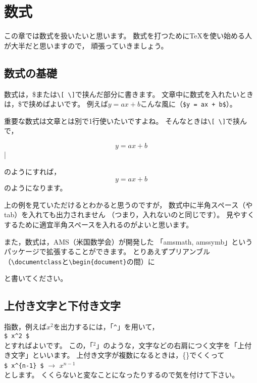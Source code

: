 \documentclass[class=jreport, crop=false, preview=false, dvipdfmx, fleqn]{standalone}
\begin{document}
\chapter{数式}
\label{ch:formulas}

この章では数式を扱いたいと思います。
数式を打つために{\TeX}を使い始める人が大半だと思いますので，
頑張っていきましょう。



\section{数式の基礎}
数式は，{\$}または\verb|\[ \]|で挟んだ部分に書きます。
文章中に数式を入れたいときは，{\$}で挟めばよいです。
例えば$y = ax + b$こんな風に（\verb|$y = ax + b$|）。

重要な数式は文章とは別で1行使いたいですよね。
そんなときは\verb|\[ \]|で挟んで，
\begin{ITeX}
\[ y = ax + b \]|
\end{ITeX}
のようにすれば，
\[ y = ax + b \]
のようになります。

上の例を見ていただけるとわかると思うのですが，
数式中に半角スペース（やtab）を入れても出力されません
（つまり，入れないのと同じです）。
見やすくするために適宜半角スペースを入れるのがよいと思います。

また，数式は，AMS（米国数学会）が開発した
「amsmath, amssymb」というパッケージで拡張することができます。
とりあえずプリアンブル（\verb|\documentclass|と\verb|\begin{document}|の間）に
\begin{ITeX}
\usepackage{amsmath, amssymb}
\end{ITeX}
と書いてください。



\section{上付き文字と下付き文字}
指数，例えば$x^2$を出力するには，「\verb|^|」を用いて，\\
\hspace{5zw} \verb|$ x^2 $| \\
とすればよいです。
この，「${}^{2}$」のような，文字などの右肩につく文字を「上付き文字」といいます。
上付き文字が複数になるときは，\{\}でくくって \\
\hspace{5zw} \verb|$ x^{n-1} $| $\rightarrow$ $x^{n-1}$ \\
とします。
くくらないと変なことになったりするので気を付けて下さい。
\end{document}
